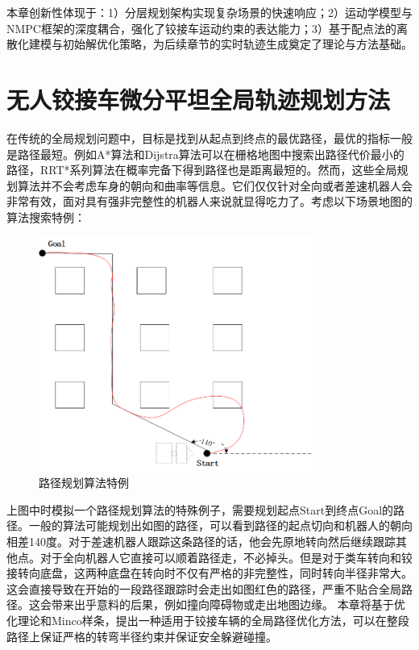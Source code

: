 \documentclass[master,academic]{ysuthesis} %
\begin{document}
	本章创新性体现于：1）分层规划架构实现复杂场景的快速响应；2）运动学模型与NMPC框架的深度耦合，强化了铰接车运动约束的表达能力；3）基于配点法的离散化建模与初始解优化策略，为后续章节的实时轨迹生成奠定了理论与方法基础。

	\chapter{无人铰接车微分平坦全局轨迹规划方法}

		在传统的全局规划问题中，目标是找到从起点到终点的最优路径，最优的指标一般是路径最短。例如A*算法和Dijstra算法可以在栅格地图中搜索出路径代价最小的路径，RRT*系列算法在概率完备下得到路径也是距离最短的。然而，这些全局规划算法并不会考虑车身的朝向和曲率等信息。它们仅仅针对全向或者差速机器人会非常有效，面对具有强非完整性的机器人来说就显得吃力了。考虑以下场景地图的算法搜索特例：  
		\begin{figure}[!ht]
			\centering
			\includegraphics[width=0.8\textwidth]{路径规划算法特例.png}
			\caption{路径规划算法特例}
			\label{fig:路径规划算法特例}
		\end{figure}
		上图中时模拟一个路径规划算法的特殊例子，需要规划起点Start到终点Goal的路径。一般的算法可能规划出如图的路径，可以看到路径的起点切向和机器人的朝向相差140度。对于差速机器人跟踪这条路径的话，他会先原地转向然后继续跟踪其他点。对于全向机器人它直接可以顺着路径走，不必掉头。但是对于类车转向和铰接转向底盘，这两种底盘在转向时不仅有严格的非完整性，同时转向半径非常大。这会直接导致在开始的一段路径跟踪时会走出如图红色的路径，严重不贴合全局路径。这会带来出乎意料的后果，例如撞向障碍物或走出地图边缘。
		本章将基于优化理论和Minco样条，提出一种适用于铰接车辆的全局路径优化方法，可以在整段路径上保证严格的转弯半径约束并保证安全躲避碰撞。
		
\end{document}
